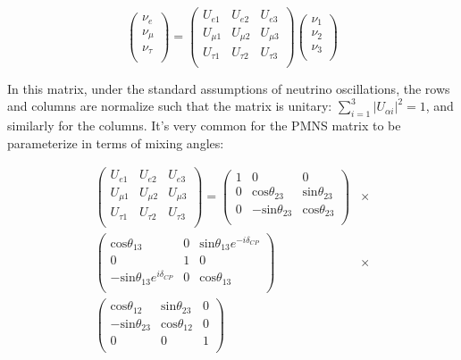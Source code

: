 \begin{equation}
  \left(
  \begin{array}{c}
    \nu_e \\
    \nu_\mu \\
    \nu_\tau \\
  \end{array}
  \right)
  =
  \left(
  \begin{array}{ccc}
    U_{e1} & U_{e2} & U_{e3}  \\
    U_{\mu1} & U_{\mu2} & U_{\mu3}  \\
    U_{\tau1} & U_{\tau2} & U_{\tau3}  \\
  \end{array} 
  \right)
  \left(
  \begin{array}{c}
    \nu_1 \\
    \nu_2 \\
    \nu_3 \\
  \end{array}
  \right)
\end{equation}

In this matrix, under the standard assumptions of neutrino oscillations, the rows and columns are normalize such that the matrix is  unitary: $\sum_{i=1}^3 | U_{\alpha i} | ^2 = 1$, and similarly for the columns.  It's very common for the PMNS matrix to be parameterize in terms of mixing angles: 

\begin{align*}
  \left(
  \begin{array}{ccc}
    U_{e1} & U_{e2} & U_{e3}  \\
    U_{\mu1} & U_{\mu2} & U_{\mu3}  \\
    U_{\tau1} & U_{\tau2} & U_{\tau3}  \\
  \end{array} 
  \right)
  = 
  \left(
  \begin{array}{ccc}
    1 & 0 & 0  \\
    0 & \text{cos}\theta_{23} & \text{sin}\theta_{23}  \\
    0 & -\text{sin}\theta_{23} & \text{cos}\theta_{23}  \\
  \end{array} 
  \right)
  &\times \\
  \left(
  \begin{array}{ccc}
     \text{cos}\theta_{13} & 0 & \text{sin}\theta_{13} e^{ - i \delta_{CP}}  \\
     0 & 1 & 0  \\
     -\text{sin}\theta_{13} e^{i \delta_{CP}} & 0 & \text{cos}\theta_{13}  \\
  \end{array} 
  \right)
  &\times \\
  \left(
  \begin{array}{ccc}
    \text{cos}\theta_{12} & \text{sin}\theta_{23} & 0  \\
    - \text{sin}\theta_{23} & \text{cos}\theta_{12} & 0 \\
    0 & 0 & 1  \\
  \end{array} 
  \right)
\end{align*}


